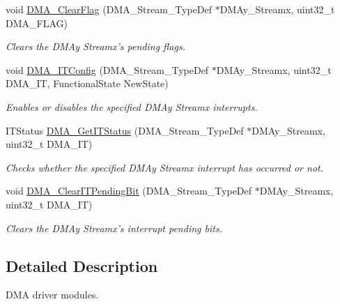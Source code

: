 \begin{DoxyCompactItemize}
void \hyperlink{group___d_m_a_ga510d62b4051f5a5de164e84b266b851d}{D\-M\-A\-\_\-\-Clear\-Flag} (D\-M\-A\-\_\-\-Stream\-\_\-\-Type\-Def $\ast$D\-M\-Ay\-\_\-\-Streamx, uint32\-\_\-t D\-M\-A\-\_\-\-F\-L\-A\-G)
\begin{DoxyCompactList}\small\item\em Clears the D\-M\-Ay Streamx's pending flags. \end{DoxyCompactList}\item 
void \hyperlink{group___d_m_a_gab9c469a3f5d4aca5c97dee798ffc2f05}{D\-M\-A\-\_\-\-I\-T\-Config} (D\-M\-A\-\_\-\-Stream\-\_\-\-Type\-Def $\ast$D\-M\-Ay\-\_\-\-Streamx, uint32\-\_\-t D\-M\-A\-\_\-\-I\-T, Functional\-State New\-State)
\begin{DoxyCompactList}\small\item\em Enables or disables the specified D\-M\-Ay Streamx interrupts. \end{DoxyCompactList}\item 
I\-T\-Status \hyperlink{group___d_m_a_gad0ccf5f6548bd7cf8f2cae30393bb716}{D\-M\-A\-\_\-\-Get\-I\-T\-Status} (D\-M\-A\-\_\-\-Stream\-\_\-\-Type\-Def $\ast$D\-M\-Ay\-\_\-\-Streamx, uint32\-\_\-t D\-M\-A\-\_\-\-I\-T)
\begin{DoxyCompactList}\small\item\em Checks whether the specified D\-M\-Ay Streamx interrupt has occurred or not. \end{DoxyCompactList}\item 
void \hyperlink{group___d_m_a_gad5433018889cd36140d98bb380c4e76e}{D\-M\-A\-\_\-\-Clear\-I\-T\-Pending\-Bit} (D\-M\-A\-\_\-\-Stream\-\_\-\-Type\-Def $\ast$D\-M\-Ay\-\_\-\-Streamx, uint32\-\_\-t D\-M\-A\-\_\-\-I\-T)
\begin{DoxyCompactList}\small\item\em Clears the D\-M\-Ay Streamx's interrupt pending bits. \end{DoxyCompactList}\end{DoxyCompactItemize}


\subsection{Detailed Description}
D\-M\-A driver modules. 

